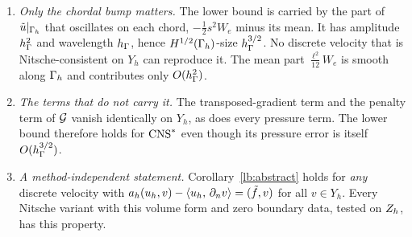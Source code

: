 \begin{remark}
\begin{enumerate}
\item \emph{Only the chordal bump matters.} The lower bound is carried by the part of $\tilde u|_{\Gamma_h}$ that oscillates on each chord, $-\frac12s^2W_e$ minus its mean. It has amplitude $h_\Gamma^2$ and wavelength $h_\Gamma$, hence $H^{1/2}(\Gamma_h)$-size $h_\Gamma^{3/2}$. No discrete velocity that is Nitsche-consistent on $Y_h$ can reproduce it. The mean part $\frac{\ell^2}{12}W_e$ is smooth along $\Gamma_h$ and contributes only $O(h_\Gamma^2)$.
\item \emph{The terms that do not carry it.} The transposed-gradient term and the penalty term of $\mathcal G$ vanish identically on $Y_h$, as does every pressure term. The lower bound therefore holds for $\mathrm{CNS}^\ast$ even though its pressure error is itself $O(h_\Gamma^{3/2})$.
\item \emph{A method-independent statement.} Corollary~\ref{lb:abstract} holds for \emph{any} discrete velocity with $a_h(u_h,v)-\langle u_h,\, \partial_n v\rangle=(\tilde f,v)$ for all $v\in Y_h$. Every Nitsche variant with this volume form and zero boundary data, tested on $Z_h$, has this property.
\end{enumerate}
\end{remark}

